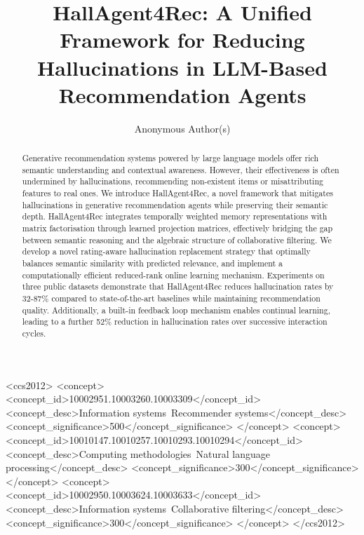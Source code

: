 \documentclass[acmsmall]{acmart}
\title{HallAgent4Rec: A Unified Framework for Reducing Hallucinations in LLM-Based Recommendation Agents}
\author{Anonymous Author(s)}
\begin{document}
\begin{abstract}
Generative recommendation systems powered by large language models offer rich semantic understanding and contextual awareness. However, their effectiveness is often undermined by hallucinations, recommending non-existent items or misattributing features to real ones. %
We introduce HallAgent4Rec, a novel framework that mitigates hallucinations in generative recommendation agents while preserving their semantic depth. HallAgent4Rec integrates temporally weighted memory representations with matrix factorisation through learned projection matrices, effectively bridging the gap between semantic reasoning and the algebraic structure of collaborative filtering. We develop a novel rating-aware hallucination replacement strategy that optimally balances semantic similarity with predicted relevance, and implement a computationally efficient reduced-rank online learning mechanism. Experiments on three public datasets demonstrate that HallAgent4Rec reduces hallucination rates by 32-87\% compared to state-of-the-art baselines while maintaining recommendation quality. Additionally, a built-in feedback loop mechanism enables continual learning, leading to a further 52\% reduction in hallucination rates over successive interaction cycles. %
 \end{abstract}
\maketitle
\begin{CCSXML}
<ccs2012>
<concept>
<concept_id>10002951.10003260.10003309</concept_id>
<concept_desc>Information systems~Recommender systems</concept_desc>
<concept_significance>500</concept_significance>
</concept>
<concept>
<concept_id>10010147.10010257.10010293.10010294</concept_id>
<concept_desc>Computing methodologies~Natural language processing</concept_desc>
<concept_significance>300</concept_significance>
</concept>
<concept>
<concept_id>10002950.10003624.10003633</concept_id>
<concept_desc>Information systems~Collaborative filtering</concept_desc>
<concept_significance>300</concept_significance>
</concept>
</ccs2012>
\end{CCSXML}

\end{document}
